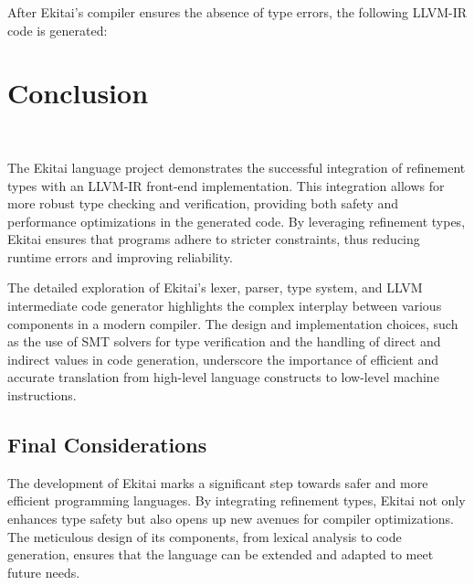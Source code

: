 \documentclass[
  oneside,
  english,
  coorientadorbanca,
  noabntexcite
]{ufsc-thesis-rn46-2019}
\begin{document}
After Ekitai's compiler ensures the absence of type errors, the following LLVM-IR code is generated:


\chapter{Conclusion}~\label{ch:conclusion}

The Ekitai language project demonstrates the successful integration of refinement types with an LLVM-IR front-end implementation. This integration allows for more robust type checking and verification, providing both safety and performance optimizations in the generated code. By leveraging refinement types, Ekitai ensures that programs adhere to stricter constraints, thus reducing runtime errors and improving reliability.

The detailed exploration of Ekitai's lexer, parser, type system, and LLVM intermediate code generator highlights the complex interplay between various components in a modern compiler. The design and implementation choices, such as the use of SMT solvers for type verification and the handling of direct and indirect values in code generation, underscore the importance of efficient and accurate translation from high-level language constructs to low-level machine instructions.

\section{Final Considerations}

The development of Ekitai marks a significant step towards safer and more efficient programming languages. By integrating refinement types, Ekitai not only enhances type safety but also opens up new avenues for compiler optimizations. The meticulous design of its components, from lexical analysis to code generation, ensures that the language can be extended and adapted to meet future needs.
\end{document}
